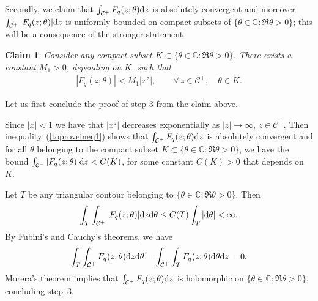 \documentclass[pdftex]{sigma}
\numberwithin{equation}{section}
\newtheorem{claim}[thm]{Claim}
\newcommand{\C}{\mathbb{C}}
\newcommand{\CC}{\mathcal{C}}
\begin{document}
Secondly, we claim that $\int_{\CC^+}{F_q(z; \theta){\rm d}z}$ is absolutely convergent and moreover $\int_{\CC^+}{|F_q(z; \theta)|{\rm d}z}$ is uniformly bounded on compact subsets of $\{\theta\in\C\colon \Re\theta > 0\}$; this will be a consequence of the stronger statement

\begin{claim}\label{bound1}
Consider any compact subset $K\subset\{\theta\in\C\colon \Re\theta > 0\}$. There exists a constant $M_1> 0$, depending on $K$, such that
\begin{gather}\label{toproveineq1}
|F_q(z; \theta)| < M_1 |x^z|, \qquad \forall\, z\in\CC^+,\quad \theta\in K.
\end{gather}
\end{claim}

Let us f\/irst conclude the proof of step 3 from the claim above.

Since $|x| < 1$ we have that $|x^z|$ decreases exponentially as $|z|\rightarrow\infty$, $z\in\CC^+$. Then inequality~(\ref{toproveineq1}) shows that $\int_{\CC^+}{F_q(z; \theta){\rm d}z}$ is absolutely convergent and for all $\theta$ belonging to the compact subset $K\subset\{\theta\in\C\colon \Re\theta > 0\}$, we have the bound $\int_{\CC^+}{|F_q(z; \theta)|{\rm d}z} < C(K)$, for some constant $C(K) > 0$ that depends on~$K$.

Let $T$ be any triangular contour belonging to $\{\theta\in\C\colon \Re\theta > 0\}$. Then
\begin{gather*}
\int_T{\int_{\CC^+}{|F_q(z; \theta)|{\rm d}z}{\rm d}\theta} \leq C(T)\int_T{|{\rm d}\theta|} < \infty.
 \end{gather*}
 By Fubini's and Cauchy's theorems, we have \begin{gather*}
 \int_T{\int_{\CC^+}{F_q(z; \theta){\rm d}z}{\rm d}\theta} = \int_{\CC^+}\int_{T}{{F_q(z; \theta){\rm d}\theta}{\rm d}z} = 0.
 \end{gather*}
Morera's theorem implies that $\int_{\CC^+}{F_q(z; \theta){\rm d}z}$ is holomorphic on $\{\theta\in\C\colon \Re\theta > 0\}$, concluding step~3.
\end{document}
